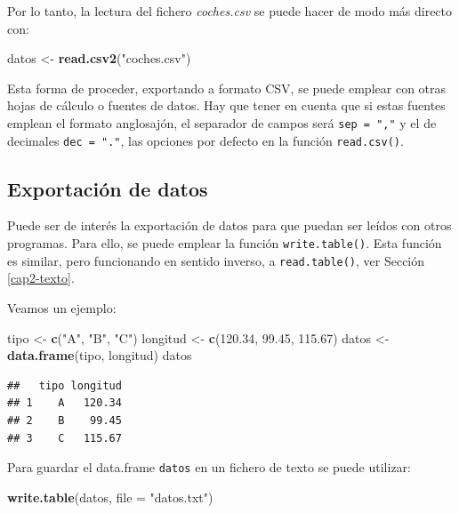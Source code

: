 \documentclass[
]{book}
\newenvironment{Shaded}{\begin{snugshade}}{\end{snugshade}}
\newcommand{\AttributeTok}[1]{\textcolor[rgb]{0.13,0.29,0.53}{#1}}
\newcommand{\FloatTok}[1]{\textcolor[rgb]{0.00,0.00,0.81}{#1}}
\newcommand{\FunctionTok}[1]{\textcolor[rgb]{0.13,0.29,0.53}{\textbf{#1}}}
\newcommand{\NormalTok}[1]{#1}
\newcommand{\OtherTok}[1]{\textcolor[rgb]{0.56,0.35,0.01}{#1}}
\newcommand{\StringTok}[1]{\textcolor[rgb]{0.31,0.60,0.02}{#1}}
\theoremstyle{break}
\theoremstyle{nonumberplain}
\begin{document}
Por lo tanto, la lectura del fichero \emph{coches.csv} se puede hacer de modo
más directo con:

\begin{Shaded}
\begin{Highlighting}[]
\NormalTok{datos }\OtherTok{\textless{}{-}} \FunctionTok{read.csv2}\NormalTok{(}\StringTok{"coches.csv"}\NormalTok{)}
\end{Highlighting}
\end{Shaded}

Esta forma de proceder, exportando a formato CSV, se puede emplear con otras hojas de cálculo o fuentes de datos.
Hay que tener en cuenta que si estas fuentes emplean el formato anglosajón, el separador de campos será \texttt{sep\ =\ ","} y el de decimales \texttt{dec\ =\ "."}, las opciones por defecto en la función \texttt{read.csv()}.

\subsection{Exportación de datos}\label{cap2-exporta}

Puede ser de interés la exportación de datos para que puedan ser leídos con otros programas. Para ello, se puede emplear la función \texttt{write.table()}. Esta función es similar, pero funcionando en sentido inverso, a \texttt{read.table()}, ver Sección \ref{cap2-texto}.

Veamos un ejemplo:

\begin{Shaded}
\begin{Highlighting}[]
\NormalTok{tipo }\OtherTok{\textless{}{-}} \FunctionTok{c}\NormalTok{(}\StringTok{"A"}\NormalTok{, }\StringTok{"B"}\NormalTok{, }\StringTok{"C"}\NormalTok{)}
\NormalTok{longitud }\OtherTok{\textless{}{-}} \FunctionTok{c}\NormalTok{(}\FloatTok{120.34}\NormalTok{, }\FloatTok{99.45}\NormalTok{, }\FloatTok{115.67}\NormalTok{)}
\NormalTok{datos }\OtherTok{\textless{}{-}} \FunctionTok{data.frame}\NormalTok{(tipo, longitud)}
\NormalTok{datos}
\end{Highlighting}
\end{Shaded}

\begin{verbatim}
##   tipo longitud
## 1    A   120.34
## 2    B    99.45
## 3    C   115.67
\end{verbatim}

Para guardar el data.frame \texttt{datos} en un fichero de texto se
puede utilizar:

\begin{Shaded}
\begin{Highlighting}[]
\FunctionTok{write.table}\NormalTok{(datos, }\AttributeTok{file =} \StringTok{"datos.txt"}\NormalTok{)}
\end{Highlighting}
\end{Shaded}
\end{document}
